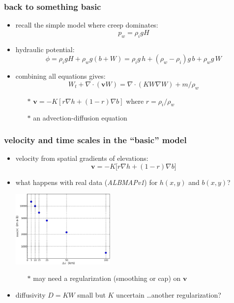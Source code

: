 \documentclass[hide notes,intlimits]{beamer}
\begin{document}
\begin{frame}
  \frametitle{back to something basic}

  \begin{itemize}
    \item recall the simple model where creep dominates:
    		$$p_w = \rho_i g H$$
    \item hydraulic potential:
      $$\phi = \rho_i g H + \rho_w g (b+W) = \rho_i g \,h + (\rho_w - \rho_i) g \,b + \rho_w g \,W$$
    \item combining all equations gives:
       $$\boxed{W_t + \nabla\cdot\left(\mathbf{v} W\right) = \nabla \cdot(K W \nabla W) + m / \rho_w}$$
      \begin{itemize}
      \vspace{-3mm}
      \item[$\ast$] $\mathbf{v} = - K \left[r \nabla h + (1-r) \nabla b\right]$  \quad where $r = \rho_i/\rho_w$
      \item[$\ast$] an advection-diffusion equation
      \end{itemize}
  \end{itemize}
\end{frame}


\begin{frame}
  \frametitle{velocity and time scales in the ``basic'' model}

  \begin{itemize}
    \item velocity from spatial gradients of elevations:
      $$\mathbf{v} = - K \Big[r \nabla h + (1-r) \nabla b\Big]$$
    \item what happens with real data (\emph{ALBMAPv1}) for $h(x,y)$ and $b(x,y)$?
    \begin{center}
    \medskip
     \qquad \includegraphics[width=0.4\textwidth]{vresults}
    \medskip
    \end{center}
       \small
       \begin{itemize}
       \item[$\ast$] may need a regularization (smoothing or cap) on $\mathbf{v}$
       \end{itemize}
       \normalsize
    \item diffusivity $D = K W$ small but $K$ uncertain \dots another regularization?
  \end{itemize}

\end{frame}
\end{document}
